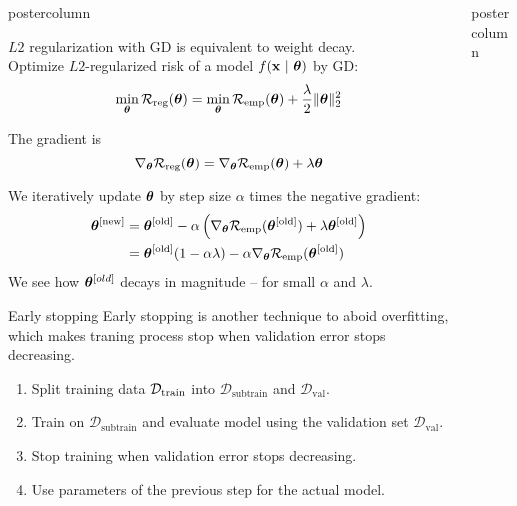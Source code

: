 \documentclass{beamer}
\newlength{\columnheight} %
\begin{document}
\begin{frame}[fragile]{}
\begin{columns}
\begin{column}{.31\textwidth}
\begin{beamercolorbox}[center]{postercolumn}
\begin{minipage}{.98\textwidth}
{\begin{myblock}{ }
$L2$ regularization with GD is equivalent to weight decay.\\

Optimize $L2$-regularized risk of a model $f(\mathbf{x} ~|~ \bm{\theta})$ by GD:
$$
\min_{\bm{\theta}} \mathcal{R}_{\text{reg}}(\bm{\theta}) = \min_{\bm{\theta}} \mathcal{R}_{\text{emp}}(\bm{\theta}) + \frac{\lambda}{2} \|\bm{\theta}\|^2_2
$$

The gradient is
$$
\nabla_{\bm{\theta}} \mathcal{R}_{\text{reg}}(\bm{\theta}) = \nabla_{\bm{\theta}} \mathcal{R}_{\text{emp}}(\bm{\theta}) + \lambda \bm{\theta}
$$

We iteratively update $\bm{\theta}$ by step size \(\alpha\) times the negative gradient:
\begin{align*}
\bm{\theta}^{[\text{new}]} &= \bm{\theta}^{[\text{old}]} - \alpha \left(\nabla_{\bm{\theta}} \mathcal{R}_{\text{emp}}(\bm{\theta}^{[\text{old}]}) + \lambda \bm{\theta}^{[\text{old}]}\right) \\&=
\bm{\theta}^{[\text{old}]} (1 - \alpha \lambda) - \alpha \nabla_{\bm{\theta}} \mathcal{R}_{\text{emp}}(\bm{\theta}^{[\text{old}]})
\end{align*}
{\small
We see how $\bm{\theta}^{[old]}$ decays in magnitude -- for small $\alpha$ and $\lambda$.}
\end{myblock}

\begin{myblock}{Early stopping}
Early stopping is another technique to aboid overfitting, which makes traning process stop when validation error stops decreasing.
\begin{enumerate}
									\setlength{\itemindent}{+.3in}
									\item Split training data $\mathcal{D}_{\text{train}}$ into $\mathcal{D}_{\text{subtrain}}$ and $\mathcal{D}_{\text{val}}.$ 
									\item Train on $\mathcal{D}_{\text{subtrain}}$ and evaluate model using the validation set $\mathcal{D}_{\text{val}}$.
									\item Stop training when validation error stops decreasing.
									\item Use parameters of the previous step for the actual model.
								\end{enumerate}


\end{myblock}
}
\end{minipage}
\end{beamercolorbox}
\end{column}


\begin{column}{.31\textwidth}
\begin{beamercolorbox}[center]{postercolumn}
\begin{minipage}{.98\textwidth}
\parbox[t][\columnheight]{\textwidth}{

}
\end{minipage}
\end{beamercolorbox}
\end{column}
\end{columns}
\end{frame}
\end{document}
